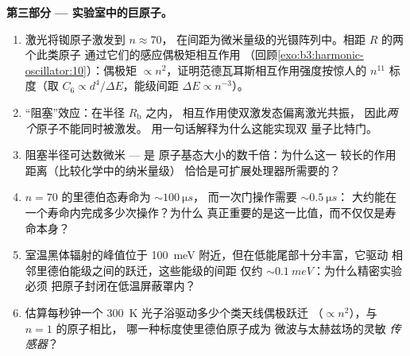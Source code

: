 \begin{problem}
\medskip\noindent\textbf{第三部分 --- 实验室中的巨原子。}
\begin{enumerate}[resume]
  \item 激光将铷原子激发到 $n \approx 70$，
        在间距为微米量级的光镊阵列中。相距 $R$ 的两个此类原子
        通过它们的感应偶极矩相互作用
        （回顾\cref{exo:b3:harmonic-oscillator:10}）：偶极矩
        $\propto n^2$，证明范德瓦耳斯相互作用强度按惊人的
        $n^{11}$ 标度（取 $C_6 \propto d^4/\Delta E$，能级间距
        $\Delta E \propto n^{-3}$）。
  \item “阻塞”效应：在半径 $R_{\text{b}}$ 之内，
        相互作用使双激发态偏离激光共振，
        因此\emph{两个}原子不能同时被激发。
        用一句话解释为什么这能实现双
        量子比特门。
  \item 阻塞半径可达数微米 --- 是
        原子基态大小的数千倍：为什么这一
        较长的作用距离（比较化学中的纳米量级）
        恰恰是可扩展处理器所需要的？
  \item $n = 70$ 的里德伯态寿命为 $\sim\qty{100}{\micro s}$，
        而一次门操作需要 $\sim\qty{0.5}{\micro s}$：
        大约能在一个寿命内完成多少次操作？为什么
        真正重要的是这一比值，而不仅仅是寿命本身？
  \item 室温黑体辐射的峰值位于
        \qty{100}{meV} 附近，但在低能尾部十分丰富，它驱动
        相邻里德伯能级之间的跃迁，这些能级的间距
        仅约 $\sim\qty{0.1}{meV}$：为什么精密实验必须
        把原子封闭在低温屏蔽罩内？
  \item 估算每秒钟一个 \qty{300}{K} 光子浴驱动多少个类天线偶极跃迁
        （$\propto n^2$），与 $n = 1$ 的原子相比，
        哪一种标度使里德伯原子成为
        微波与太赫兹场的灵敏
        \emph{传感器}？
\end{enumerate}


\end{problem}
